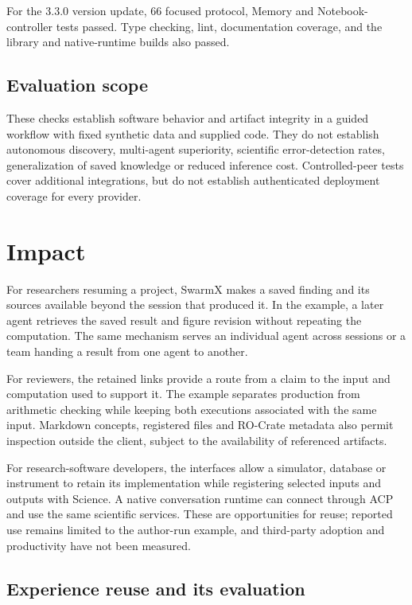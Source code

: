 \documentclass[preprint,12pt,a4paper]{elsarticle}
\begin{document}
For the 3.3.0 version update, 66 focused protocol, Memory and Notebook-controller tests passed.
Type checking, lint, documentation coverage, and the library and native-runtime builds also passed.

\subsection{Evaluation scope}
\label{sec:scope-limitations}

These checks establish software behavior and artifact integrity in a guided workflow with
fixed synthetic data and supplied code. They do not establish autonomous discovery,
multi-agent superiority, scientific error-detection rates, generalization of saved knowledge
or reduced inference cost. Controlled-peer tests cover additional integrations, but do not
establish authenticated deployment coverage for every provider.

\section{Impact}
\label{sec:impact}

For researchers resuming a project, SwarmX makes a saved finding and its sources available
beyond the session that produced it. In the example, a later agent retrieves the saved
result and figure revision without repeating the computation. The same mechanism serves an
individual agent across sessions or a team handing a result from one agent to another.

For reviewers, the retained links provide a route from a claim to the input and computation
used to support it. The example separates production from arithmetic checking while keeping
both executions associated with the same input. Markdown concepts, registered files and
RO-Crate metadata also permit inspection outside the client, subject to the availability
of referenced artifacts.

For research-software developers, the interfaces allow a simulator, database or instrument
to retain its implementation while registering selected inputs and outputs with Science.
A native conversation runtime can connect through ACP and use the same scientific services.
These are opportunities for reuse; reported use remains limited to the author-run example,
and third-party adoption and productivity have not been measured.

\subsection{Experience reuse and its evaluation}
\label{sec:reuse}
\end{document}
